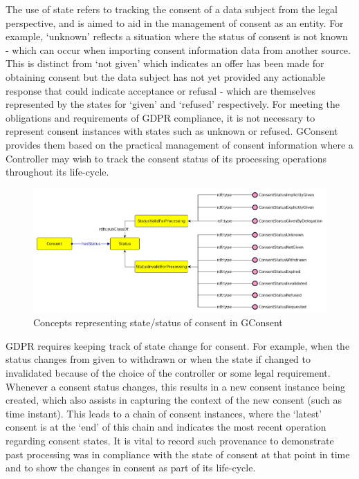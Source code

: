 The use of state refers to tracking the consent of a data subject from the legal perspective, and is aimed to aid in the management of consent as an entity. For example, `unknown' reflects a situation where the status of consent is not known - which can occur when importing consent information data from another source.
This is distinct from `not given' which indicates an offer has been made for obtaining consent but the data subject has not yet provided any actionable response that could indicate acceptance or refusal - which are themselves represented by the states for `given' and `refused' respectively.
For meeting the obligations and requirements of GDPR compliance, it is not necessary to represent consent instances with states such as unknown or refused.
GConsent provides them based on the practical management of consent information where a Controller may wish to track the consent status of its processing operations throughout its life-cycle.
\begin{figure}[htbp]
    \centering
    \includegraphics[width=\linewidth]{img/gconsent_status.png}
    \caption{Concepts representing state/status of consent in GConsent \cite{pandit_gconsent_2019}}
    \label{fig:vocabs:gconsent-status}
\end{figure}

GDPR requires keeping track of state change for consent. For example, when the status changes from given to withdrawn or when the state if changed to invalidated because of the choice of the controller or some legal requirement. Whenever a consent status changes, this results in a new consent instance being created, which also assists in capturing the context of the new consent (such as time instant). This leads to a chain of consent instances, where the `latest' consent is at the `end' of this chain and indicates the most recent operation regarding consent states. It is vital to record such provenance to demonstrate past processing was in compliance with the state of consent at that point in time and to show the changes in consent as part of its life-cycle.

